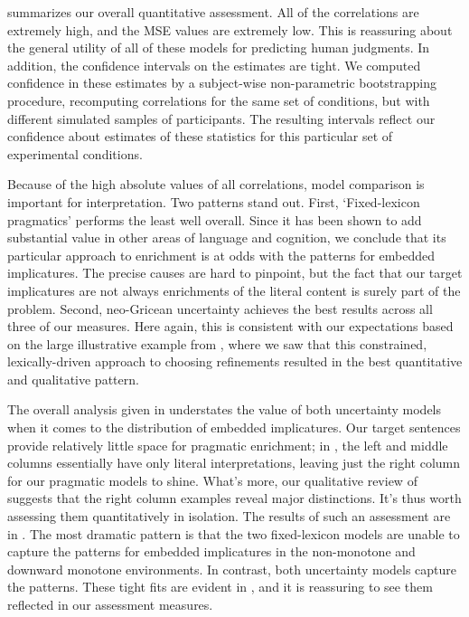 \documentclass[leqno,12pt]{article}
\begin{document}
 summarizes our overall quantitative
assessment. All of the correlations are extremely high, and the MSE
values are extremely low. This is reassuring about the general utility
of all of these models for predicting human judgments. 
In addition, the 
confidence intervals on the estimates are tight. We computed confidence in 
these estimates by a subject-wise non-parametric bootstrapping procedure, 
recomputing correlations for the same set of conditions, but with different 
simulated samples of participants. The resulting intervals reflect
our confidence about estimates of these statistics for this particular set of 
experimental conditions.

Because of the high absolute values of all correlations, model comparison 
is important for interpretation. Two patterns stand out.  First,
`Fixed-lexicon pragmatics' performs the least well overall.  Since it
has been shown to add substantial value in other areas of language and
cognition, we conclude that its particular approach to enrichment is
at odds with the patterns for embedded implicatures.  The precise
causes are hard to pinpoint, but the fact that our target implicatures
are not always enrichments of the literal content is surely part of
the problem. Second, neo-Gricean uncertainty achieves the best results
across all three of our measures. Here again, this is consistent with
our expectations based on the large illustrative example from
, where we saw that this constrained,
lexically-driven approach to choosing refinements resulted in the best
quantitative and qualitative pattern.

The overall analysis given in  understates the
value of both uncertainty models when it comes to the distribution of
embedded implicatures. Our target sentences provide relatively little
space for pragmatic enrichment; in , the left
and middle columns essentially have only literal interpretations,
leaving just the right column for our pragmatic models to
shine. What's more, our qualitative review of
 suggests that the right column examples
reveal major distinctions. It's thus worth assessing them
quantitatively in isolation. The results of such an assessment are in
.  The most dramatic pattern is that the two
fixed-lexicon models are unable to capture the patterns for embedded
implicatures in the non-monotone and downward monotone
environments. In contrast, both uncertainty models capture the
patterns. These tight fits are evident in ,
and it is reassuring to see them reflected in our assessment measures.
\end{document}
